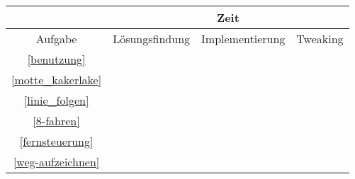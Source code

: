 
\begin{center}
	\begin{tabular}{  c | c | c | c |}
		\cline{2-4}
		& \multicolumn{3}{|c|}{Zeit}  \\ 
		\hline
		\multicolumn{1}{|c|}{Aufgabe} & Lösungsfindung & Implementierung & Tweaking \\
		\hline
		\hline
		\multicolumn{1}{|c|}{\nameref{benutzung} \ref{benutzung}}  &  &  & \\ 
		\hline
		\multicolumn{1}{|c|}{\nameref{motte_kakerlake} \ref{motte_kakerlake}}  &  &  & \\ 
		\hline
		\multicolumn{1}{|c|}{\nameref{linie_folgen} \ref{linie_folgen}} &  &  & \\ 
		\hline
		\multicolumn{1}{|c|}{\nameref{8-fahren} \ref{8-fahren}} &  &  &\\ 
		\hline
		\multicolumn{1}{|c|}{\nameref{fernsteuerung} \ref{fernsteuerung}} &  &  & \\ 
		\hline
		\multicolumn{1}{|c|}{\nameref{weg-aufzeichnen} \ref{weg-aufzeichnen}} &  &  & \\ 
		\hline
  \end{tabular}
\end{center}
